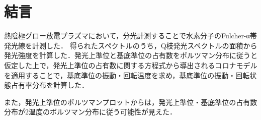 \chapter{結言}

熱陰極グロー放電プラズマにおいて，分光計測することで水素分子のFulcher-α帯発光線を計測した．
得られたスペクトルのうち，Q枝発光スペクトルの面積から発光強度を計算した．発光上準位と基底準位の占有数をボルツマン分布に従うと仮定した上で，発光上準位の占有数に関する方程式から導出されるコロナモデルを適用することで，基底準位の振動・回転温度を求め，基底準位の振動・回転状態占有率分布を計算した．

また，発光上準位のボルツマンプロットからは，発光上準位・基底準位の占有数分布が2温度のボルツマン分布に従う可能性が見えた．